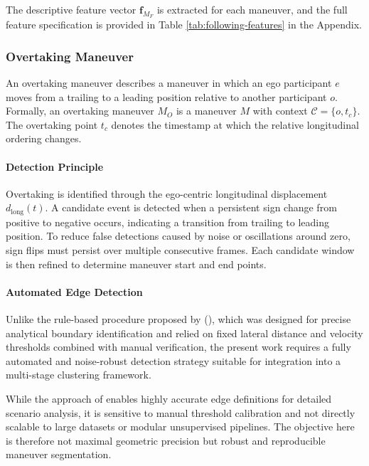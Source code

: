 The descriptive feature vector $\mathbf{f}_{M_F}$ is extracted for each maneuver, and the full feature specification is provided in Table \ref{tab:following-features} in the Appendix.

\subsubsection{Overtaking Maneuver}

An overtaking maneuver describes a maneuver in which an ego participant $e$ moves from a trailing to a leading position relative to another participant $o$. Formally, an overtaking maneuver $M_O$ is a maneuver $M$ with context $\mathcal{C}=\{o, t_c\}$. The overtaking point $t_c$ denotes the timestamp at which the relative longitudinal ordering changes.

\paragraph{Detection Principle}
Overtaking is identified through the ego-centric longitudinal displacement $d_{\text{long}}(t)$. A candidate event is detected when a persistent sign change from positive to negative occurs, indicating a transition from trailing to leading position. To reduce false detections caused by noise or oscillations around zero, sign flips must persist over multiple consecutive frames. Each candidate window is then refined to determine maneuver start and end points. 

\paragraph{Automated Edge Detection}
Unlike the rule-based procedure proposed by \citeauthor{kutsch_analyzing_2025} (\citeyear{kutsch_analyzing_2025}), which was designed for precise analytical boundary identification and relied on fixed lateral distance and velocity thresholds combined with manual verification, the present work requires a fully automated and noise-robust detection strategy suitable for integration into a multi-stage clustering framework.

While the approach of \citeauthor{kutsch_analyzing_2025} enables highly accurate edge definitions for detailed scenario analysis, it is sensitive to manual threshold calibration and not directly scalable to large datasets or modular unsupervised pipelines. The objective here is therefore not maximal geometric precision but robust and reproducible maneuver segmentation.

